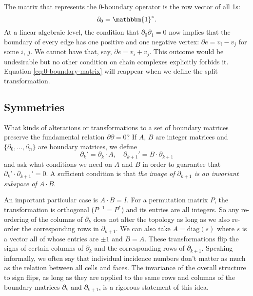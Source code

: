 \documentclass[twocolumn]{article}
\begin{document}
The matrix that represents the 0-boundary operator is the row vector of all 1s:
\begin{equation}
    \partial_0 = \mathbbm{1}^*.
    \label{eq:0-boundary-matrix}
\end{equation}
At a linear algebraic level, the condition that $\partial_0\partial_1 = 0$ now implies that the boundary of every edge has one positive and one negative vertex: $\partial e = v_i - v_j$ for some $i$, $j$.
We cannot have that, say, $\partial e = v_i + v_j$.
This outcome would be undesirable but no other condition on chain complexes explicitly forbids it.
Equation \eqref{eq:0-boundary-matrix} will reappear when we define the split transformation.


\subsection{Symmetries}

What kinds of alterations or transformations to a set of boundary matrices preserve the fundamental relation $\partial\partial = 0$?
If $A$, $B$ are integer matrices and $\{\partial_0, \ldots, \partial_n\}$ are boundary matrices, we define
\begin{equation}
    \partial_k' = \partial_k\cdot A, \quad \partial_{k + 1}' = B\cdot\partial_{k + 1}
\end{equation}
and ask what conditions we need on $A$ and $B$ in order to guarantee that $\partial_k'\cdot\partial_{k + 1}' = 0$.
A sufficient condition is that \emph{the image of $\partial_{k + 1}$ is an invariant subspace of $A\cdot B$}.

An important particular case is $A\cdot B = I$.
For a permutation matrix $P$, the transformation is orthogonal ($P^{-1} = P^*$) and its entries are all integers.
So any re-ordering of the columns of $\partial_k$ does not alter the topology as long as we also re-order the corresponding rows in $\partial_{k + 1}$.
We can also take $A = \text{diag}(s)$ where $s$ is a vector all of whose entries are $\pm 1$ and $B = A$.
These transformations flip the signs of certain columns of $\partial_k$ and the corresponding rows of $\partial_{k + 1}$.
Speaking informally, we often say that individual incidence numbers don't matter as much as the relation between all cells and faces.
The invariance of the overall structure to sign flips, as long as they are applied to the same rows and columns of the boundary matrices $\partial_k$ and $\partial_{k + 1}$, is a rigorous statement of this idea.
\end{document}
